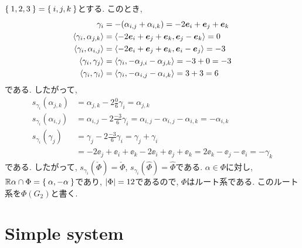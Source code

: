 $\Set{1,2,3}=\Set{i,j,k}$とする.
このとき,
\begin{align*}
  \gamma_{i}&=-(\alpha_{i,j}+\alpha_{i,k})=-2\boldsymbol{e}_i+\boldsymbol{e}_j+\boldsymbol{e}_k\\
  \Braket{\gamma_{i},\alpha_{j,k}}
  &=\Braket{-2\boldsymbol{e}_i+\boldsymbol{e}_j+\boldsymbol{e}_k,\boldsymbol{e}_j-\boldsymbol{e}_k}=0\\
  \Braket{\gamma_{i},\alpha_{i,j}}
  &=\Braket{-2\boldsymbol{e}_i+\boldsymbol{e}_j+\boldsymbol{e}_k,\boldsymbol{e}_i-\boldsymbol{e}_j}=-3\\
  \Braket{\gamma_{i},\gamma_{j}}
  &=\Braket{\gamma_i,-\alpha_{j,i}-\alpha_{j,k}}=-3+0=-3\\
  \Braket{\gamma_{i},\gamma_{i}}
  &=\Braket{\gamma_i,-\alpha_{i,j}-\alpha_{i,k}}=3+3=6
\end{align*}
である. したがって,
\begin{align*}
  s_{\gamma_{i}}(\alpha_{j,k})&=\alpha_{j,k}-2\frac{0}{6}\gamma_i
  =\alpha_{j,k}\\
  s_{\gamma_{i}}(\alpha_{i,j})&=\alpha_{i,j}-2\frac{-3}{6}\gamma_i
  =\alpha_{i,j}-\alpha_{i,j}-\alpha_{i,k}=-\alpha_{i,k}\\
  s_{\gamma_{i}}(\gamma_{j})&=\gamma_{j}-2\frac{-3}{6}\gamma_i
  =\gamma_j+\gamma_i\\
  &=-2\ee_j+\ee_i+\ee_k-2\ee_i+\ee_j+\ee_k
  =2\ee_k-\ee_j-\ee_i=-\gamma_k
\end{align*}
である.
したがって,
$s_{\gamma_i}(\check\Phi)=\check\Phi$,
$s_{\gamma_i}(\hat\Phi)=\hat\Phi$である.
$\alpha\in\Phi$に対し, $\mathbb{R}\alpha\cap\Phi=\Set{\alpha,-\alpha}$であり,
$\left|\Phi\right|=12$であるので, $\Phi$はルート系である.
このルート系を$\Phi(G_2)$と書く.


\chapter{Simple system}
